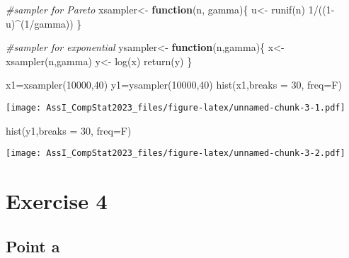 \documentclass[
]{article}
\newenvironment{Shaded}{\begin{snugshade}}{\end{snugshade}}
\newcommand{\AttributeTok}[1]{\textcolor[rgb]{0.77,0.63,0.00}{#1}}
\newcommand{\CommentTok}[1]{\textcolor[rgb]{0.56,0.35,0.01}{\textit{#1}}}
\newcommand{\ControlFlowTok}[1]{\textcolor[rgb]{0.13,0.29,0.53}{\textbf{#1}}}
\newcommand{\DecValTok}[1]{\textcolor[rgb]{0.00,0.00,0.81}{#1}}
\newcommand{\FunctionTok}[1]{\textcolor[rgb]{0.00,0.00,0.00}{#1}}
\newcommand{\NormalTok}[1]{#1}
\newcommand{\OtherTok}[1]{\textcolor[rgb]{0.56,0.35,0.01}{#1}}
\newcommand{\SpecialCharTok}[1]{\textcolor[rgb]{0.00,0.00,0.00}{#1}}
\begin{document}
\begin{Shaded}
\begin{Highlighting}[]
\CommentTok{\#sampler for Pareto}
\NormalTok{xsampler}\OtherTok{\textless{}{-}} \ControlFlowTok{function}\NormalTok{(n, gamma)\{}
\NormalTok{  u}\OtherTok{\textless{}{-}} \FunctionTok{runif}\NormalTok{(n)}
  \DecValTok{1}\SpecialCharTok{/}\NormalTok{((}\DecValTok{1}\SpecialCharTok{{-}}\NormalTok{u)}\SpecialCharTok{\^{}}\NormalTok{(}\DecValTok{1}\SpecialCharTok{/}\NormalTok{gamma))}
\NormalTok{\}}

\CommentTok{\#sampler for exponential}
\NormalTok{ysampler}\OtherTok{\textless{}{-}} \ControlFlowTok{function}\NormalTok{(n,gamma)\{}
\NormalTok{  x}\OtherTok{\textless{}{-}} \FunctionTok{xsampler}\NormalTok{(n,gamma)}
\NormalTok{  y}\OtherTok{\textless{}{-}} \FunctionTok{log}\NormalTok{(x)}
  \FunctionTok{return}\NormalTok{(y)}
\NormalTok{\}}

\NormalTok{x1}\OtherTok{=}\FunctionTok{xsampler}\NormalTok{(}\DecValTok{10000}\NormalTok{,}\DecValTok{40}\NormalTok{)}
\NormalTok{y1}\OtherTok{=}\FunctionTok{ysampler}\NormalTok{(}\DecValTok{10000}\NormalTok{,}\DecValTok{40}\NormalTok{)}
\FunctionTok{hist}\NormalTok{(x1,}\AttributeTok{breaks =} \DecValTok{30}\NormalTok{, }\AttributeTok{freq=}\NormalTok{F)}
\end{Highlighting}
\end{Shaded}

\texttt{[image: AssI\_CompStat2023\_files/figure-latex/unnamed-chunk-3-1.pdf]}

\begin{Shaded}
\begin{Highlighting}[]
\FunctionTok{hist}\NormalTok{(y1,}\AttributeTok{breaks =} \DecValTok{30}\NormalTok{, }\AttributeTok{freq=}\NormalTok{F)}
\end{Highlighting}
\end{Shaded}

\texttt{[image: AssI\_CompStat2023\_files/figure-latex/unnamed-chunk-3-2.pdf]}

\hypertarget{exercise-4}{%
\section{Exercise 4}\label{exercise-4}}

\hypertarget{point-a-2}{%
\subsection{Point a}\label{point-a-2}}
\end{document}
